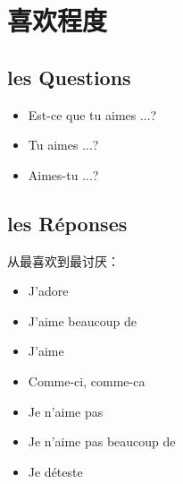 
\chapter{喜欢程度}


\section{les Questions}
\begin{itemize}
\item Est-ce que tu aimes ...?
\item Tu aimes ...?
\item Aimes-tu ...?
\end{itemize}


\section{les Réponses}

从最喜欢到最讨厌：

\begin{itemize}
\item J'adore 
\item J'aime beaucoup de
\item J'aime
\item Comme-ci, comme-ca
\item Je n'aime pas
\item Je n'aime pas beaucoup de
\item Je déteste
\end{itemize}


